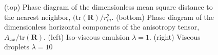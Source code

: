 \begin{figure}[h!]
    \caption{
        (top) Phase diagram of the dimensionless mean square distance to the nearest neighbor, $(\text{tr}(\textbf{R})/r_m^2$.
        (bottom) Phase diagram of the dimensionless horizontal components of the anisotropy tensor, $A_{xx}/\text{tr}(\textbf{R})$.  
        (left) Iso-viscous emulsion $\lambda = 1$.
        (right) Viscous droplets $\lambda = 10$ }
    \label{fig:phase}
\end{figure}

